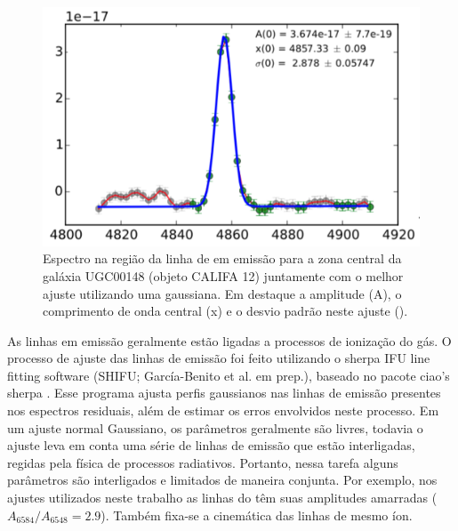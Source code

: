 \begin{figure}
	\centering
	\includegraphics[scale=0.4]{figuras/K0012-zone0-Hb.pdf}
	\caption[Exemplo de ajuste de linha de emissão]
	{Espectro na região da linha de \Hbeta em emissão para a zona central da galáxia UGC00148 (objeto
CALIFA 12) juntamente com o melhor ajuste utilizando uma gaussiana. Em destaque a amplitude (A), o
comprimento de onda central (x) e o desvio padrão neste ajuste (\sigma).}
	\label{fig:rgbline}
\end{figure}

As linhas em emissão geralmente estão ligadas a processos de ionização do gás. O processo de ajuste das linhas de emissão foi feito utilizando o {\sc sherpa} IFU line fitting software (SHIFU; García-Benito et al. em prep.), baseado no pacote {\sc ciao's sherpa} \citep{Freeman.etal.2001, Doe.etal.2007}. Esse programa ajusta perfis gaussianos nas linhas de emissão presentes nos espectros residuais, além de estimar os erros envolvidos neste processo. Em um ajuste normal Gaussiano, os parâmetros geralmente são livres, todavia o ajuste leva em conta uma série de linhas de emissão que estão interligadas, regidas pela física de processos radiativos. Portanto, nessa tarefa alguns parâmetros são interligados e limitados de maneira conjunta. Por exemplo, nos ajustes utilizados neste trabalho as linhas do \nii têm suas amplitudes amarradas ($A_{6584}/A_{6548} = 2.9$). Também fixa-se a cinemática das linhas de mesmo íon.

